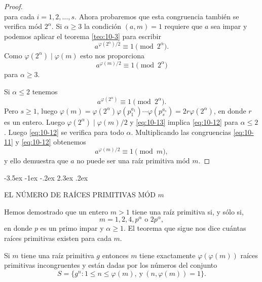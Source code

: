 \documentclass[12pt,a4paper]{book}
\makeatletter
\renewcommand\section{\@startsection{section}{1}{\z@}%
  {-3.5ex \@plus -1ex \@minus -.2ex}%
  {2.3ex \@plus .2ex}%
  {\normalfont\Large\bfseries\raggedright}}
\makeatother
\begin{document}
\begin{proof}
\begin{equation}
        \end{equation}
        para cada $i=1,2,\dots,s$. Ahora probaremos que esta congruencia también se verifica
        mód $2^{\alpha}$. Si $\alpha\geq3$ la condición $(a,m)=1$ requiere que $a$ sea impar
        y podemos aplicar el teorema \ref{teo:10-3} para escribir
        \begin{equation*}
            a^{\varphi(2^{\alpha})/2}\equiv1\pmod{2^{\alpha}}.
        \end{equation*}
        Como $\varphi(2^{\alpha})\mid\varphi(m)$ esto nos proporciona
        \begin{equation}\label{eq:10-12}
            a^{\varphi(m)/2}\equiv1\pmod{2^{\alpha}}
        \end{equation}
        para $\alpha\geq3$.

        Si $\alpha\leq2$ tenemos
        \begin{equation}\label{eq:10-13}
            a^{\varphi(2^{\alpha})}\equiv1\pmod{2^{\alpha}}.
        \end{equation}
        Pero $s\geq1$, luego $\varphi(m)=\varphi(2^{\alpha})\varphi(p_{1}^{a_{1}})\cdots\varphi(p_{s}^{a_{s}})=2r\varphi(2^{\alpha})$,
        en donde $r$ es un entero. Luego $\varphi(2^{\alpha})\mid\varphi(m)/2$ y
        \eqref{eq:10-13} implica \eqref{eq:10-12} para $\alpha\leq2$. Luego \eqref{eq:10-12}
        se verifica para todo $\alpha$. Multiplicando las congruencias \eqref{eq:10-11} y
        \eqref{eq:10-12} obtenemos
        \begin{equation*}
            a^{\varphi(m)/2}\equiv1\pmod{m},
        \end{equation*}
        y ello demuestra que $a$ no puede ser una raíz primitiva mód $m$.
    \end{proof}

    \section{EL NÚMERO DE RAÍCES PRIMITIVAS MÓD \texorpdfstring{$m$}{m}}

    Hemos demostrado que un entero $m>1$ tiene una raíz primitiva si, y sólo si,
    \begin{equation*}
        m=1,2,4,p^{\alpha}\text{ o }2p^{\alpha},
    \end{equation*}
    en donde $p$ es un primo impar y $\alpha\geq1$. El teorema que sigue nos dice cuántas
    raíces primitivas existen para cada $m$.

    \begin{teorema}\label{teo:10-9}
        Si $m$ tiene una raíz primitiva $g$ entonces $m$ tiene exactamente
        $\varphi(\varphi(m))$ raíces primitivas incongruentes y están dadas por los números
        del conjunto
        \begin{equation*}
            S=\{g^{n}:1\leq n\leq\varphi(m),\ \text{y}\ (n,\varphi(m))=1\}.
        \end{equation*}
    \end{teorema}
\end{document}

